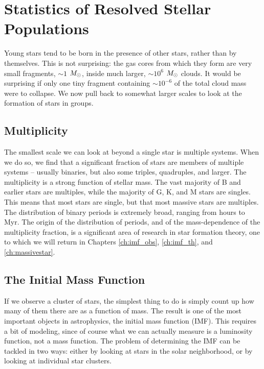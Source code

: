 \section{Statistics of Resolved Stellar Populations}

Young stars tend to be born in the presence of other stars, rather than by themselves. This is not surprising: the gas cores from which they form are very small fragments, $\sim 1$ $M_{\odot}$, inside much larger, $\sim 10^6$ $M_{\odot}$ clouds. It would be surprising if only one tiny fragment containing $\sim 10^{-6}$ of the total cloud mass were to collapse. We now pull back to somewhat larger scales to look at the formation of stars in groups.

\subsection{Multiplicity}

The smallest scale we can look at beyond a single star is multiple systems. When we do so, we find that a significant fraction of stars are members of multiple systems -- usually binaries, but also some triples, quadruples, and larger. The multiplicity is a strong function of stellar mass. The vast majority of B and earlier stars are multiples, while the majority of G, K, and M stars are singles. This means that most stars are single, but that most massive stars are multiples. The distribution of binary periods is extremely broad, ranging from hours to Myr. The origin of the distribution of periods, and of the mass-dependence of the multiplicity fraction, is a significant area of research in star formation theory, one to which we will return in Chapters \ref{ch:imf_obs}, \ref{ch:imf_th}, and \ref{ch:massivestar}.

\subsection{The Initial Mass Function}

If we observe a cluster of stars, the simplest thing to do is simply count up how many of them there are as a function of mass. The result is one of the most important objects in astrophysics, the initial mass function (IMF). This requires a bit of modeling, since of course what we can actually measure is a luminosity function, not a mass function. The problem of determining the IMF can be tackled in two ways: either by looking at stars in the solar neighborhood, or by looking at individual star clusters.

